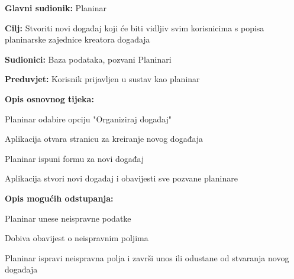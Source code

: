 			\noindent {}
		\begin{packed_item}
			
			\item \textbf{Glavni sudionik: }$ $Planinar$ $
			\item  \textbf{Cilj:} $ $Stvoriti novi događaj koji će biti vidljiv svim korisnicima s popisa planinarske zajednice kreatora događaja$ $
			\item  \textbf{Sudionici:} $ $Baza podataka, pozvani Planinari$ $
			\item  \textbf{Preduvjet:} $ $Korisnik prijavljen u sustav kao planinar$ $
			\item  \textbf{Opis osnovnog tijeka:}
			
			\item[] \begin{packed_enum}
				
				\item $ $Planinar odabire opciju "Organiziraj događaj"$ $
				\item $ $Aplikacija otvara stranicu za kreiranje novog događaja$ $
				\item $ $Planinar ispuni formu za novi događaj$ $	
				\item $ $Aplikacija stvori novi događaj i obavijesti sve pozvane planinare$ $
			\end{packed_enum}
			\item  \textbf{Opis mogućih odstupanja:}
			
			\item[] \begin{packed_item}
				
				\item[3.a] $ $Planinar unese neispravne podatke$ $
				\item[] \begin{packed_enum}
					
					\item $ $Dobiva obavijest o neispravnim poljima$ $
					\item $ $Planinar ispravi neispravna polja i završi unos ili odustane od stvaranja novog događaja$ $
				\end{packed_enum}
			\end{packed_item}
		\end{packed_item}
	
